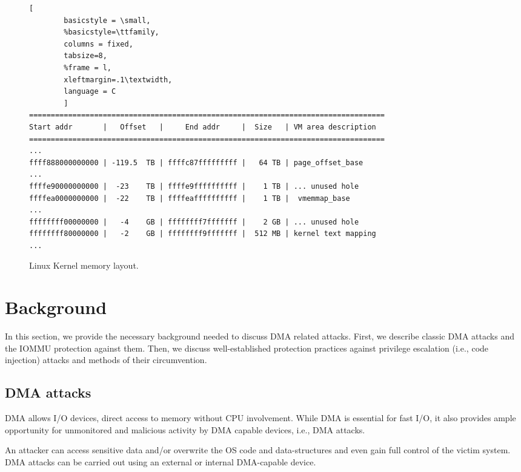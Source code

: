 \begin{figure*}[t]

        \begin{lstlisting}[
        basicstyle = \small,
        %basicstyle=\ttfamily,
        columns = fixed,
        tabsize=8,
        %frame = l,
        xleftmargin=.1\textwidth,
        language = C
        ]
==================================================================================
Start addr       |   Offset   |     End addr     |  Size   | VM area description
==================================================================================
...
ffff888000000000 | -119.5  TB | ffffc87fffffffff |   64 TB | page_offset_base
...
ffffe90000000000 |  -23    TB | ffffe9ffffffffff |    1 TB | ... unused hole
ffffea0000000000 |  -22    TB | ffffeaffffffffff |    1 TB |  vmemmap_base
...
ffffffff00000000 |   -4    GB | ffffffff7fffffff |    2 GB | ... unused hole
ffffffff80000000 |   -2    GB | ffffffff9fffffff |  512 MB | kernel text mapping
...
                \end{lstlisting}
        \caption{ Linux Kernel memory layout.}
        \label{fig:mem_layot}

\end{figure*}

\section{Background}

In this section, we provide the necessary background needed to discuss DMA related attacks. First, we describe classic DMA attacks and the IOMMU protection against them. Then, we discuss well-established protection practices against privilege escalation (i.e., code injection) attacks and methods of their circumvention.

\subsection{DMA attacks}

DMA allows I/O devices, direct access to memory \cite{oC54} without CPU involvement. While DMA is essential for fast I/O, it also provides ample opportunity for unmonitored and malicious activity by DMA capable devices, i.e., DMA attacks. 

An attacker can access sensitive data and/or overwrite the OS code and data-structures and even gain full control of the victim system. DMA attacks can be carried out using an external or internal DMA-capable device. 

